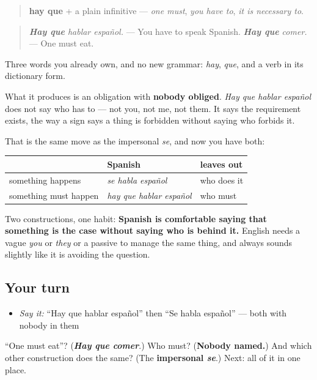\begin{grammarlens}[title={Grammar Lens: an obligation with nobody in it}]
\begin{quote}
\textbf{hay que} + a plain infinitive — \emph{one must}, \emph{you have to}, \emph{it is necessary to}.
\end{quote}

\begin{quote}
\emph{\textbf{Hay que} hablar español.} — You have to speak Spanish. \emph{\textbf{Hay que} comer.} — One must eat.
\end{quote}

Three words you already own, and no new grammar: \emph{hay}, \emph{que}, and a verb in its dictionary form.

What it produces is an obligation with \textbf{nobody obliged}. \emph{Hay que hablar español} does not say who has to — not you, not me, not them. It says the requirement exists, the way a sign says a thing is forbidden without saying who forbids it.

That is the same move as the impersonal \emph{se}, and now you have both:

\noindent
\begin{tabularx}{\linewidth}{@{}>{\raggedright\arraybackslash}X>{\raggedright\arraybackslash}X>{\raggedright\arraybackslash}X@{}}
\toprule
\textbf{} & \textbf{Spanish} & \textbf{leaves out} \\
\midrule
something happens & \emph{se habla español} & who does it \\
something must happen & \emph{hay que hablar español} & who must \\
\bottomrule
\end{tabularx}

Two constructions, one habit: \textbf{Spanish is comfortable saying that something is the case without saying who is behind it.} English needs a vague \emph{you} or \emph{they} or a passive to manage the same thing, and always sounds slightly like it is avoiding the question.
\end{grammarlens}

\subsection*{Your turn}
\begin{itemize}
\raggedright
  \item \emph{Say it:} \textquotedblleft{}Hay que hablar español\textquotedblright{} then \textquotedblleft{}Se habla español\textquotedblright{} — both with nobody in them
\end{itemize}

\begin{tcolorbox}[breakable,colback=teal!4,colframe=teal!35!black,title={Before you move on}]
\textquotedblleft{}One must eat\textquotedblright{}? (\emph{\textbf{Hay que comer}}.) Who must? (\textbf{Nobody named.}) And which other construction does the same? (The \textbf{impersonal \emph{se}}.) Next: all of it in one place.
\end{tcolorbox}
